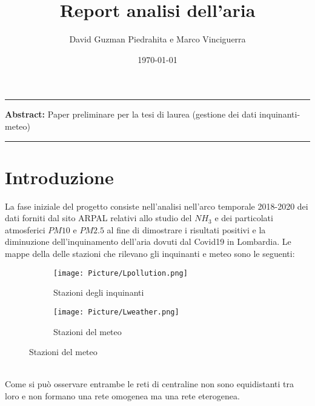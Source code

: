 \documentclass{article}
\title{Report analisi dell'aria}
\author{David Guzman Piedrahita e Marco Vinciguerra}
\date{\today}
\begin{document}
\maketitle

\par\noindent\rule{\textwidth}{0.4pt}
\textbf{Abstract:} Paper preliminare per la tesi di laurea (gestione dei dati inquinanti-meteo)
\par\noindent\rule{\textwidth}{0.4pt}

\section{Introduzione}
La fase iniziale del progetto consiste nell'analisi nell'arco temporale 2018-2020 dei dati 
forniti dal sito ARPAL relativi allo studio del $NH_{3}$ e dei particolati atmosferici $PM10$ e $PM2.5$ al 
fine di dimostrare i risultati positivi e la diminuzione dell'inquinamento dell'aria 
dovuti dal Covid19 in Lombardia. Le mappe della delle stazioni che rilevano gli inquinanti e meteo sono le 
seguenti:
\begin{figure}
    \centering
    \begin{subfigure}{.5\textwidth}
      \centering
      \texttt{[image: Picture/Lpollution.png]}
      \caption{Stazioni degli inquinanti}
      \label{fig:sub1}
    \end{subfigure}%
    \begin{subfigure}{.5\textwidth}
      \centering
      \texttt{[image: Picture/Lweather.png]}
      \caption{Stazioni del meteo}
      \label{fig:sub2}
    \end{subfigure}
    \label{fig:test}
\end{figure}
\\Come si può osservare entrambe le reti di centraline non sono equidistanti tra loro e non formano 
una rete omogenea ma una rete eterogenea.
\end{document}
